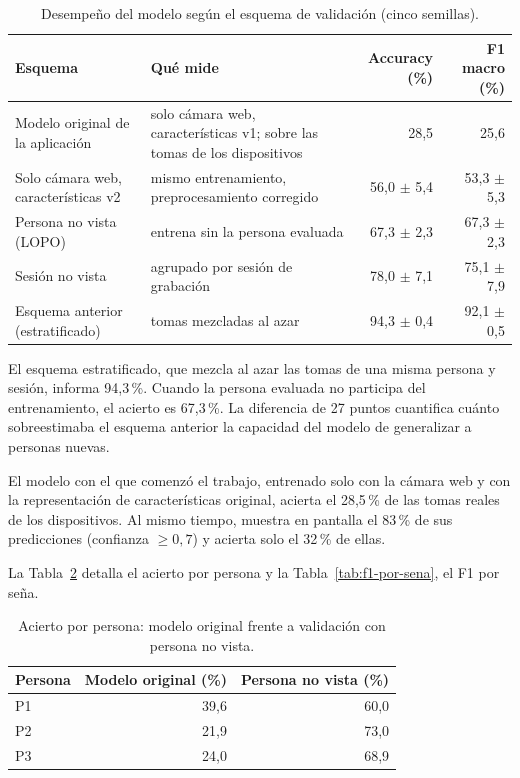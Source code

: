 \begin{table}[h]
    \centering
    \small
    \small
    \begin{tabular}{p{4.6cm}p{5.0cm}rr}
        \toprule
        Esquema & Qué mide & Accuracy (\%) & F1 macro (\%) \\
        \midrule
        Modelo original de la aplicación & solo cámara web, características v1; sobre las tomas de los dispositivos & 28,5 & 25,6 \\
        Solo cámara web, características v2 & mismo entrenamiento, preprocesamiento corregido & 56,0 $\pm$ 5,4 & 53,3 $\pm$ 5,3 \\
        Persona no vista (LOPO) & entrena sin la persona evaluada & 67,3 $\pm$ 2,3 & 67,3 $\pm$ 2,3 \\
        Sesión no vista & agrupado por sesión de grabación & 78,0 $\pm$ 7,1 & 75,1 $\pm$ 7,9 \\
        Esquema anterior (estratificado) & tomas mezcladas al azar & 94,3 $\pm$ 0,4 & 92,1 $\pm$ 0,5 \\
        \bottomrule
    \end{tabular}
    \caption{Desempeño del modelo según el esquema de validación (cinco semillas).}
    \label{tab:escenarios}
\end{table}

El esquema estratificado, que mezcla al azar las tomas de una misma persona y sesión, informa 94,3\,\%. Cuando la persona evaluada no participa del entrenamiento, el acierto es 67,3\,\%. La diferencia de 27 puntos cuantifica cuánto sobreestimaba el esquema anterior la capacidad del modelo de generalizar a personas nuevas.

El modelo con el que comenzó el trabajo, entrenado solo con la cámara web y con la representación de características original, acierta el 28,5\,\% de las tomas reales de los dispositivos. Al mismo tiempo, muestra en pantalla el 83\,\% de sus predicciones (confianza $\geq 0{,}7$) y acierta solo el 32\,\% de ellas.

La Tabla~\ref{tab:por-persona} detalla el acierto por persona y la Tabla~\ref{tab:f1-por-sena}, el F1 por seña.

\begin{table}[h]
    \centering
    \begin{tabular}{lrr}
        \toprule
        Persona & Modelo original (\%) & Persona no vista (\%) \\
        \midrule
        P1 & 39,6 & 60,0 \\
        P2 & 21,9 & 73,0 \\
        P3 & 24,0 & 68,9 \\
        \bottomrule
    \end{tabular}
    \caption{Acierto por persona: modelo original frente a validación con persona no vista.}
    \label{tab:por-persona}
\end{table}

